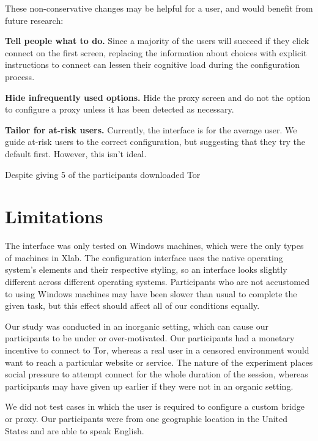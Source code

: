 \documentclass[USenglish,oneside,twocolumn]{article}
\begin{document}
These non-conservative changes may be helpful for a user, and would benefit from future research: \\

\begin{description}
\item {\bfseries Tell people what to do.} Since a majority of the users will succeed if they click connect on the first screen, replacing the information about choices with explicit instructions to connect can lessen their cognitive load during the configuration process. 
\item{\bfseries Hide infrequently used options.} Hide the proxy screen and do not the option to configure a proxy unless it has been detected as necessary.
\item{\bfseries Tailor for at-risk users.} Currently, the interface is for the average user. We guide at-risk users to the correct configuration, but suggesting that they try the default first. However, this isn't ideal. 
\end{description} 

Despite giving 5 of the participants downloaded Tor 

\section{Limitations} 
The interface was only tested on Windows machines, which were the only types of machines in Xlab. The configuration interface uses the native operating system's elements and their respective styling, so an interface looks slightly different across different operating systems. Participants who are not accustomed to using Windows machines may have been slower than usual to complete the given task, but this effect should affect all of our conditions equally. 

Our study was conducted in an inorganic setting, which can cause our participants to be under or over-motivated. Our participants had a monetary incentive to connect to Tor, whereas a real user in a censored environment would want to reach a particular website or service. The nature of the experiment places social pressure to attempt connect for the whole duration of the session, whereas participants may have given up earlier if they were not in an organic setting.   

We did not test cases in which the user is required to configure a custom bridge or proxy. Our participants were from one geographic location in the United States and are able to speak English.
\end{document}
